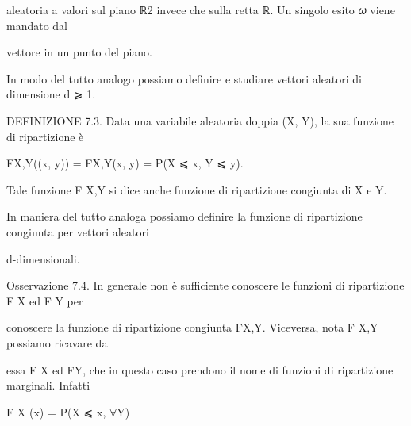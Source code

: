 \documentclass[a4paper,portrait,12pt]{article}
\begin{document}
\begin{flushleft}
aleatoria a valori sul piano ℝ2 invece che sulla retta ℝ. Un singolo esito 𝜔 viene mandato dal
\end{flushleft}


\begin{flushleft}
vettore in un punto del piano.
\end{flushleft}


\begin{flushleft}
In modo del tutto analogo possiamo definire e studiare vettori aleatori di dimensione d ⩾ 1.
\end{flushleft}


\begin{flushleft}
DEFINIZIONE 7.3. Data una variabile aleatoria doppia (X, Y), la sua funzione di ripartizione \`{e}
\end{flushleft}


\begin{flushleft}
FX,Y((x, y)) = FX,Y(x, y) = P(X ⩽ x, Y ⩽ y).
\end{flushleft}


\begin{flushleft}
Tale funzione F X,Y si dice anche funzione di ripartizione congiunta di X e Y.
\end{flushleft}


\begin{flushleft}
In maniera del tutto analoga possiamo definire la funzione di ripartizione congiunta per vettori aleatori
\end{flushleft}


\begin{flushleft}
d-dimensionali.
\end{flushleft}


\begin{flushleft}
Osservazione 7.4. In generale non \`{e} sufficiente conoscere le funzioni di ripartizione F X ed F Y per
\end{flushleft}


\begin{flushleft}
conoscere la funzione di ripartizione congiunta FX,Y. Viceversa, nota F X,Y possiamo ricavare da
\end{flushleft}


\begin{flushleft}
essa F X ed FY, che in questo caso prendono il nome di funzioni di ripartizione marginali. Infatti
\end{flushleft}


\begin{flushleft}
F X (x) = P(X ⩽ x, $\forall$Y)
\end{flushleft}
\end{document}
